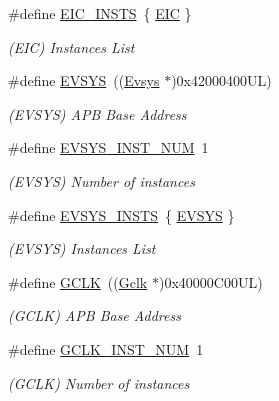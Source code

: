 \begin{DoxyCompactItemize}
\#define \mbox{\hyperlink{group___s_a_m_d21_g15_l__base_ga6cde9c1621d07e94617a55185fd37aa8}{E\+I\+C\+\_\+\+I\+N\+S\+TS}}~\{ \mbox{\hyperlink{group___s_a_m_d21_j18_a__base_ga27183a94584b5fca7e1207ce7a79782a}{E\+IC}} \}
\begin{DoxyCompactList}\small\item\em (E\+IC) Instances List \end{DoxyCompactList}\item 
\#define \mbox{\hyperlink{group___s_a_m_d21_g15_l__base_ga9e745464ad55101201203e77e762b8d1}{E\+V\+S\+YS}}~((\mbox{\hyperlink{struct_evsys}{Evsys}}    $\ast$)0x42000400\+U\+L)
\begin{DoxyCompactList}\small\item\em (E\+V\+S\+YS) A\+PB Base Address \end{DoxyCompactList}\item 
\#define \mbox{\hyperlink{group___s_a_m_d21_g15_l__base_ga583d75632c4ff28dfacb316701432719}{E\+V\+S\+Y\+S\+\_\+\+I\+N\+S\+T\+\_\+\+N\+UM}}~1
\begin{DoxyCompactList}\small\item\em (E\+V\+S\+YS) Number of instances \end{DoxyCompactList}\item 
\#define \mbox{\hyperlink{group___s_a_m_d21_g15_l__base_ga0af5305dde743bb82fbe58740726c78f}{E\+V\+S\+Y\+S\+\_\+\+I\+N\+S\+TS}}~\{ \mbox{\hyperlink{group___s_a_m_d21_j18_a__base_ga9e745464ad55101201203e77e762b8d1}{E\+V\+S\+YS}} \}
\begin{DoxyCompactList}\small\item\em (E\+V\+S\+YS) Instances List \end{DoxyCompactList}\item 
\#define \mbox{\hyperlink{group___s_a_m_d21_g15_l__base_ga23f9186cfd6ee5e60c8485315183271f}{G\+C\+LK}}~((\mbox{\hyperlink{struct_gclk}{Gclk}}     $\ast$)0x40000\+C00\+U\+L)
\begin{DoxyCompactList}\small\item\em (G\+C\+LK) A\+PB Base Address \end{DoxyCompactList}\item 
\#define \mbox{\hyperlink{group___s_a_m_d21_g15_l__base_gae4b5dc7eb760330c53681cda768fe9a2}{G\+C\+L\+K\+\_\+\+I\+N\+S\+T\+\_\+\+N\+UM}}~1
\begin{DoxyCompactList}\small\item\em (G\+C\+LK) Number of instances \end{DoxyCompactList}\item 

\end{DoxyCompactItemize}
